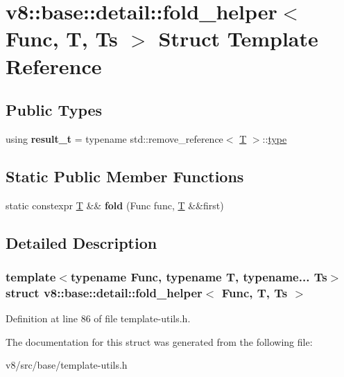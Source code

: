 \hypertarget{structv8_1_1base_1_1detail_1_1fold__helper}{}\section{v8\+:\+:base\+:\+:detail\+:\+:fold\+\_\+helper$<$ Func, T, Ts $>$ Struct Template Reference}
\label{structv8_1_1base_1_1detail_1_1fold__helper}
\subsection*{Public Types}
\begin{DoxyCompactItemize}
\item 
\mbox{\label{structv8_1_1base_1_1detail_1_1fold__helper_ada0622357326269a60f9cfca63e254fc}} 
using {\bfseries result\+\_\+t} = typename std\+::remove\+\_\+reference$<$ \mbox{\hyperlink{classv8_1_1internal_1_1torque_1_1T}{T}} $>$\+::\mbox{\hyperlink{classstd_1_1conditional_1_1type}{type}}
\end{DoxyCompactItemize}
\subsection*{Static Public Member Functions}
\begin{DoxyCompactItemize}
\item 
\mbox{\label{structv8_1_1base_1_1detail_1_1fold__helper_a9a11ba828d7b7866b2a669e5a2b1f506}} 
static constexpr \mbox{\hyperlink{classv8_1_1internal_1_1torque_1_1T}{T}} \&\& {\bfseries fold} (Func func, \mbox{\hyperlink{classv8_1_1internal_1_1torque_1_1T}{T}} \&\&first)
\end{DoxyCompactItemize}


\subsection{Detailed Description}
\subsubsection*{template$<$typename Func, typename T, typename... Ts$>$\newline
struct v8\+::base\+::detail\+::fold\+\_\+helper$<$ Func, T, Ts $>$}



Definition at line 86 of file template-\/utils.\+h.



The documentation for this struct was generated from the following file\+:\begin{DoxyCompactItemize}
\item 
v8/src/base/template-\/utils.\+h\end{DoxyCompactItemize}
